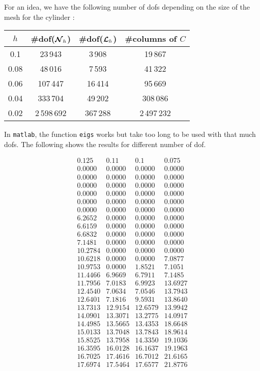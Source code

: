 For an idea, we have the following number of dofs depending on the size of the mesh for the cylinder :
\begin{center}
\begin{tabular}{ c | c | c | c }
$h$ & \#dof(${\bm{\mathcal{N}}}_h$) & \#dof(${\bm{\mathcal{L}}}_h$) & \#columns of $C$ \\ \hline
0.1 & 23\,943 & 3\,908 & 19\,867 \\ \hline
0.08 & 48\,016 & 7\,593 & 41\,322 \\ \hline
0.06 & 107\,447 & 16\,414 & 95\,669 \\ \hline
0.04 & 333\,704 & 49\,202 & 308\,086 \\ \hline
0.02 & 2\,598\,692 & 367\,288 & 2\,497\,232 \\ \hline
\end{tabular}
\end{center}

In \texttt{matlab}, the function \texttt{eigs} works but take too long to be
used with that much dofs. The following shows the results for different number
of dof.

\[
\begin{array}{cccc}
0.125  & 0.11   & 0.1    & 0.075 \\ \hline
0.0000 & 0.0000 & 0.0000 & 0.0000\\ 
0.0000 & 0.0000 & 0.0000 & 0.0000\\ 
0.0000 & 0.0000 & 0.0000 & 0.0000\\ 
0.0000 & 0.0000 & 0.0000 & 0.0000\\ 
0.0000 & 0.0000 & 0.0000 & 0.0000\\ 
0.0000 & 0.0000 & 0.0000 & 0.0000\\ 
6.2652 & 0.0000 & 0.0000 & 0.0000\\ 
6.6159 & 0.0000 & 0.0000 & 0.0000\\ 
6.6832 & 0.0000 & 0.0000 & 0.0000\\ 
7.1481 & 0.0000 & 0.0000 & 0.0000\\ 
10.2784 & 0.0000 & 0.0000 & 0.0000\\ 
10.6218 & 0.0000 & 0.0000 & 7.0877\\ 
10.9753 & 0.0000 & 1.8521 & 7.1051\\ 
11.4466 & 6.9669 & 6.7911 & 7.1485\\ 
11.7956 & 7.0183 & 6.9923 & 13.6927\\ 
12.4540 & 7.0634 & 7.0546 & 13.7943\\ 
12.6401 & 7.1816 & 9.5931 & 13.8640\\ 
13.7313 & 12.9154 & 12.6579 & 13.9942\\ 
14.0901 & 13.3071 & 13.2775 & 14.0917\\ 
14.4985 & 13.5665 & 13.4353 & 18.6648\\ 
15.0133 & 13.7048 & 13.7843 & 18.9614\\ 
15.8525 & 13.7958 & 14.3350 & 19.1036\\ 
16.3595 & 16.0128 & 16.1637 & 19.1963\\ 
16.7025 & 17.4616 & 16.7012 & 21.6165\\ 
17.6974 & 17.5464 & 17.6577 & 21.8776\\ 
\end{array}
\]

